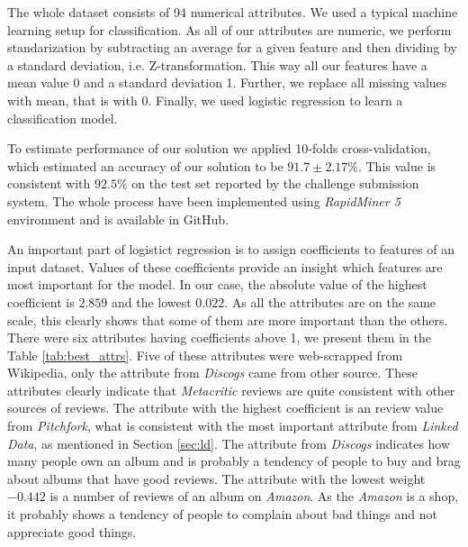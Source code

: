 \documentclass{llncs}
\begin{document}
The whole dataset consists of 94 numerical attributes.
We used a typical machine learning setup for classification.
As all of our attributes are numeric, we perform standarization by subtracting an average for a given feature and then dividing by a standard deviation, i.e. Z-transformation.
This way all our features have a mean value 0 and a standard deviation 1.
Further, we replace all missing values with mean, that is with 0.
Finally, we used logistic regression \cite{logistic_regression} to learn a classification model.

To estimate performance of our solution we applied 10-folds cross-validation, which estimated an accuracy of our solution to be $91.7\pm 2.17\%$.
This value is consistent with $92.5\%$ on the test set reported by the challenge submission system.
The whole process have been implemented using \emph{RapidMiner 5} environment and is available in GitHub.

An important part of logistict regression is to assign coefficients to features of an input dataset.
Values of these coefficients provide an insight which features are most important for the model.
In our case, the absolute value of the highest coefficient is $2.859$ and the lowest $0.022$.
As all the attributes are on the same scale, this clearly shows that some of them are more important than the others.
There were six attributes having coefficients above 1, we present them in the Table \ref{tab:best_attrs}.
Five of these attributes were web-scrapped from Wikipedia, only the attribute from \emph{Discogs} came from other source.
These attributes clearly indicate that \emph{Metacritic} reviews are quite consistent with other sources of reviews.
The attribute with the highest coefficient is an review value from \emph{Pitchfork}, what is consistent with the most important attribute from \emph{Linked Data}, as mentioned in Section \ref{sec:ld}.
The attribute from \emph{Discogs} indicates how many people own an album and is probably a tendency of people to buy and brag about albums that have good reviews.
The attribute with the lowest weight $-0.442$ is a number of reviews of an album on \emph{Amazon}.
As the \emph{Amazon} is a shop, it probably shows a tendency of people to complain about bad things and not appreciate good things.
\end{document}
